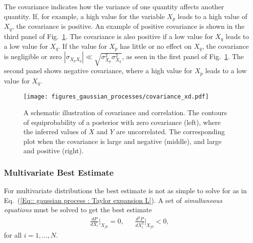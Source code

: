 \documentclass[twoside,english]{uiofysmaster}
\begin{document}
{{The covariance indicates how the variance of one quantity affects another quantity. If, for example, a high value for the variable $X_p$ leads to a high value of $X_q$, the covariance is positive. An example of positive covariance is shown in the third panel of Fig.~\ref{Fig:: gaussian process : Covariance illustrated}. The covariance is also positive if a low value for $X_q$ leads to a low value for $X_q$. If the value for $X_p$ has little or no effect on $X_q$, the covariance is negligible or zero $|\sigma_{X_pX_q}| \ll \sqrt{\sigma_{X_p}^2 \sigma_{X_q}^2}$, as seen in the first panel of Fig.~\ref{Fig:: gaussian process : Covariance illustrated}. The second panel shows negative covariance, where a high value for $X_p$ leads to a low value for $X_q$.


\begin{figure}
\centering
\texttt{[image: figures\_gaussian\_processes/covariance\_xd.pdf]}
\caption{A schematic illustration of covariance and correlation. The contours of equiprobability of a posterior with zero covariance (left), where the inferred values of $X$ and $Y$ are uncorrelated. The corresponding plot when the covariance is large and negative (middle), and large and positive (right).}
\label{Fig:: gaussian process : Covariance illustrated}
\end{figure}

\subsubsection{Multivariate Best Estimate}

For multivariate distributions the best estimate is not as simple to solve for as in Eq.~(\ref{Eq:: gaussian process : Taylor expansion L}). A set of \textit{simultaneous equations} must be solved to get the best estimate
\begin{align}\label{Eq:: gaussian process : Best estimate X_i}
&\frac{dP}{dX_i} \Big|_{X_{j0}} =0, &&\frac{d^2P}{dX_i^2} \Big|_{X_{j0}} < 0,
\end{align}
for all $i=1,...,N$.

}}
\end{document}
